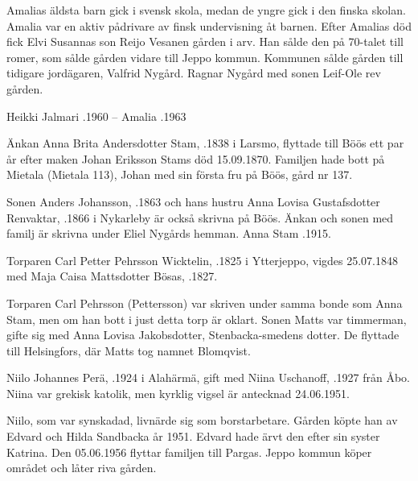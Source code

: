Amalias äldsta barn gick i svensk skola, medan de yngre gick i den finska skolan. Amalia var en aktiv pådrivare av finsk undervisning åt barnen. Efter Amalias död fick Elvi Susannas son Reijo Vesanen gården i arv. Han sålde den på 70-talet till romer, som sålde gården vidare till Jeppo kommun. Kommunen sålde gården till tidigare jordägaren, Valfrid Nygård. Ragnar Nygård med sonen Leif-Ole rev gården.

Heikki Jalmari .1960  --  Amalia .1963


Änkan Anna Brita Andersdotter Stam, .1838 i Larsmo, flyttade till Böös ett par år efter maken Johan Eriksson Stams död 15.09.1870. Familjen hade bott på Mietala (Mietala 113), Johan med sin första fru på Böös, gård nr 137.

Sonen Anders Johansson, .1863 och hans hustru Anna Lovisa Gustafsdotter Renvaktar, .1866 i Nykarleby är också skrivna på Böös. Änkan och sonen med familj är skrivna under Eliel Nygårds hemman. Anna Stam .1915.


Torparen Carl Petter Pehrsson Wicktelin, .1825 i Ytterjeppo, vigdes 25.07.1848 med Maja Caisa Mattsdotter Bösas, .1827.
\begin{jhchildren}
  \item {}
  \item {}
  \item {}
  \item {}
  \item {}
  \item {}
\end{jhchildren}
Torparen Carl Pehrsson (Pettersson) var skriven under samma bonde som Anna Stam, men om han bott i just detta torp är oklart. Sonen 			Matts var timmerman, gifte sig med Anna Lovisa Jakobsdotter, Stenbacka-smedens dotter. De flyttade till  Helsingfors, där Matts tog 			namnet Blomqvist.




Niilo Johannes Perä, .1924 i Alahärmä, gift med Niina Uschanoff, .1927 från Åbo. Niina var grekisk katolik, men kyrklig vigsel är antecknad 24.06.1951.
\begin{jhchildren}
  \item {}
  \item {}
  \item {}
\end{jhchildren}
Niilo, som var synskadad, livnärde sig som borstarbetare. Gården köpte han av Edvard och Hilda Sandbacka år 1951. Edvard hade ärvt den efter sin syster Katrina. Den 05.06.1956 flyttar familjen till Pargas. Jeppo kommun köper området och låter riva gården.


